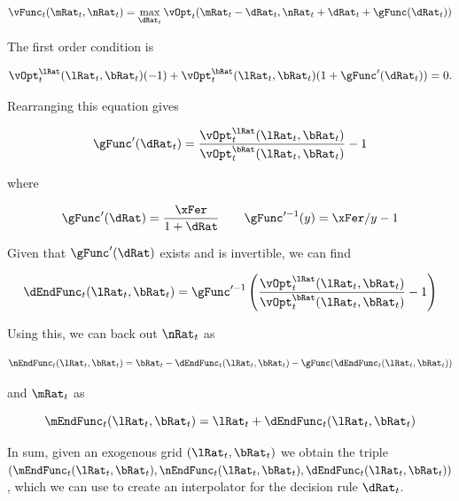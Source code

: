 \documentclass[\econtexRoot/SequentialEGM]{subfiles}
\begin{document}
\begin{equation}
	\vFunc_{t}(\mRat_{t}, \nRat_{t}) = \max_{\dRat_{t}}
	\vOpt_{t}(\mRat_{t}
	- \dRat_{t}, \nRat_{t} + \dRat_{t} + \gFunc(\dRat_{t}))
\end{equation}

The first order condition is

\begin{equation}
	\vOpt_{t}^{\lRat}(\lRat_{t}, \bRat_{t})(-1) +
	\vOpt_{t}^{\bRat}(\lRat_{t}, \bRat_{t})(1+\gFunc'(\dRat_{t})) = 0.
\end{equation}

Rearranging this equation gives

\begin{equation}
	\gFunc'(\dRat_{t}) = \frac{\vOpt_{t}^{\lRat}(\lRat_{t},
		\bRat_{t})}{\vOpt_{t}^{\bRat}(\lRat_{t}, \bRat_{t})} - 1
\end{equation}

where

\begin{equation}
	\gFunc'(\dRat) =
	\frac{\xFer}{1+\dRat} \qquad \gFunc'^{-1}(y) = \xFer/y - 1
\end{equation}

Given that $\gFunc'(\dRat)$ exists and is invertible, we can find

\begin{equation}
	\dEndFunc_{t}(\lRat_{t}, \bRat_{t}) = \gFunc'^{-1}\left(
	\frac{\vOpt_{t}^{\lRat}(\lRat_{t},
		\bRat_{t})}{\vOpt_{t}^{\bRat}(\lRat_{t},
		\bRat_{t})} - 1 \right)
\end{equation}

Using this, we can back out $\nRat_{t}$ as

\begin{equation}
	\nEndFunc_{t}(\lRat_{t}, \bRat_{t}) = \bRat_{t} -
	\dEndFunc_{t}(\lRat_{t}, \bRat_{t}) - \gFunc(\dEndFunc_{t}(\lRat_{t},
		\bRat_{t}))
\end{equation}

and $\mRat_{t}$ as

\begin{equation}
	\mEndFunc_{t}(\lRat_{t}, \bRat_{t}) = \lRat_{t} +
	\dEndFunc_{t}(\lRat_{t}, \bRat_{t})
\end{equation}

In sum, given an exogenous grid $(\lRat_{t}, \bRat_{t})$ we obtain the triple
$\left(\mEndFunc_{t}(\lRat_{t}, \bRat_{t}), \nEndFunc_{t}(\lRat_{t},
		\bRat_{t}), \dEndFunc_{t}(\lRat_{t}, \bRat_{t})\right)$, which
we can use to
create an interpolator for the decision rule $\dRat_{t}$.
\end{document}
